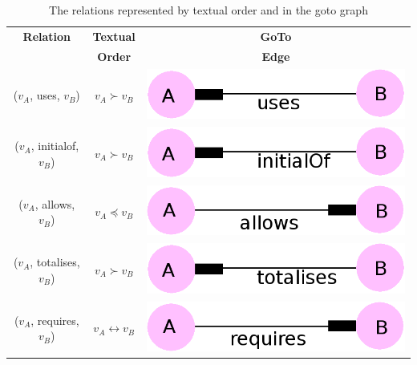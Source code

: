 \begin{table}[H]
\centering
\begin{tabular}{| c | c | c |}
\hline
\textbf{Relation} & \textbf{Textual} & \textbf{GoTo} \\
& \textbf{Order} & \textbf{Edge} \\
\hline
($v_{A}$, uses, $v_{B}$) & $v_{A} \succ v_{B}$ &
\includegraphics[scale=0.15]{Figures/Formalising/uses.png} \\
\hline
($v_{A}$, initialof, $v_{B}$) & $v_{A} \succ v_{B}$  &
\includegraphics[scale=0.15]{Figures/Formalising/initialof.png} \\
\hline
($v_{A}$, allows, $v_{B}$) & $v_{A} \preceq v_{B}$ &
\includegraphics[scale=0.15]{Figures/Formalising/allows.png} \\
\hline
($v_{A}$, totalises, $v_{B}$) & $v_{A} \succ v_{B}$ &
\includegraphics[scale=0.15]{Figures/Formalising/totalises.png} \\
\hline
($v_{A}$, requires, $v_{B}$) & $v_{A} \leftrightarrow v_{B}$ &
\includegraphics[scale=0.15]{Figures/Formalising/requires.png} \\
\hline
\end{tabular}
\caption{The relations represented by textual order and in the goto graph \label{tab:gotorelations}}
\end{table}

